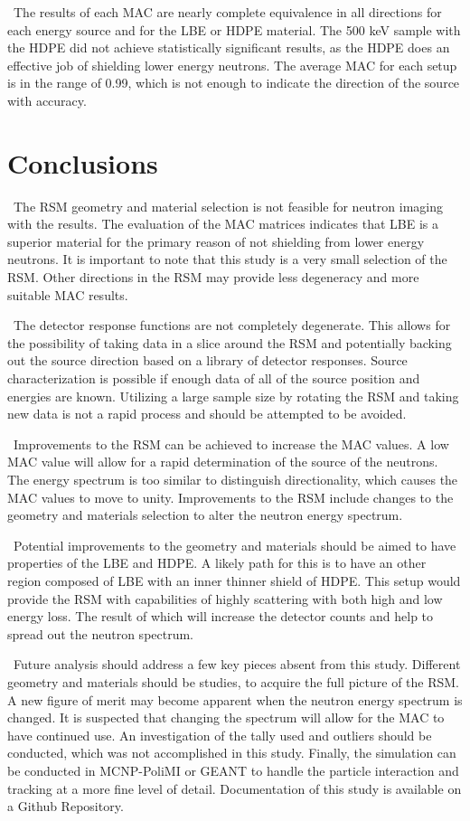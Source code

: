 \documentclass[journal]{IEEEtran}
\begin{document}
    \ The results of each MAC are nearly complete equivalence in all directions for each energy source and for the LBE or HDPE material.  The 500 keV sample with the HDPE did not achieve statistically significant results, as the HDPE does an effective job of shielding lower energy neutrons.  The average MAC for each setup is in the range of 0.99, which is not enough to indicate the direction of the source with accuracy. 

	\section{Conclusions}
	\ The RSM geometry and material selection is not feasible for neutron imaging with the results.  The evaluation of the MAC matrices indicates that LBE is a superior material for the primary reason of not shielding from lower energy neutrons.  It is important to note that this study is a very small selection of the RSM.  Other directions in the RSM may provide less degeneracy and more suitable MAC results. 
	
	\ The detector response functions are not completely degenerate.  This allows for the possibility of taking data in a slice around the RSM and potentially backing out the source direction based on a library of detector responses.  Source characterization is possible if enough data of all of the source position and energies are known.  Utilizing a large sample size by rotating the RSM and taking new data is not a rapid process and should be attempted to be avoided. 
	
	\ Improvements to the RSM can be achieved to increase the MAC values.  A low MAC value will allow for a rapid determination of the source of the neutrons.  The energy spectrum is too similar to distinguish directionality, which causes the MAC values to move to unity.  Improvements to the RSM include changes to the geometry and materials selection to alter the neutron energy spectrum.  
	
	\ Potential improvements to the geometry and materials should be aimed to have properties of the LBE and HDPE.  A likely path for this is to have an other region composed of LBE with an inner thinner shield of HDPE.  This setup would provide the RSM with capabilities of highly scattering with both high and low energy loss.  The result of which will increase the detector counts and help to spread out the neutron spectrum.  
	
	\ Future analysis should address a few key pieces absent from this study.  Different geometry and materials should be studies, to acquire the full picture of the RSM. A new figure of merit may become apparent when the neutron energy spectrum is changed.  It is suspected that changing the spectrum will allow for the MAC to have continued use.  An investigation of the tally used and outliers should be conducted, which was not accomplished in this study.  Finally, the simulation can be conducted in MCNP-PoliMI or GEANT to handle the particle interaction and tracking at a more fine level of detail.  Documentation of this study is available on a Github Repository\cite{RSMcode}. 
	
\end{document}
